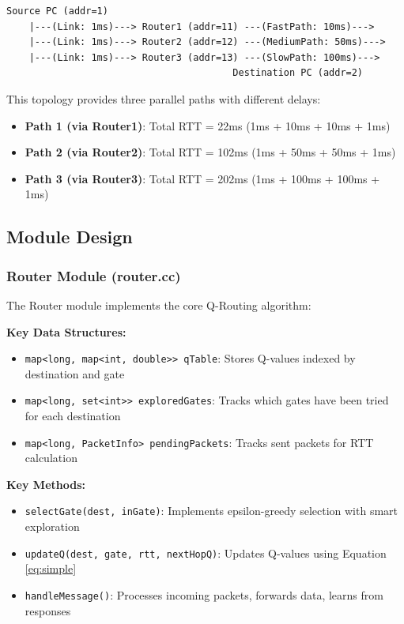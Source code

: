 \documentclass[12pt,a4paper]{article}
\begin{document}
\begin{verbatim}
Source PC (addr=1)
    |---(Link: 1ms)---> Router1 (addr=11) ---(FastPath: 10ms)---> 
    |---(Link: 1ms)---> Router2 (addr=12) ---(MediumPath: 50ms)--->
    |---(Link: 1ms)---> Router3 (addr=13) ---(SlowPath: 100ms)---> 
                                        Destination PC (addr=2)
\end{verbatim}

This topology provides three parallel paths with different delays:
\begin{itemize}
    \item \textbf{Path 1 (via Router1)}: Total RTT = 22ms (1ms + 10ms + 10ms + 1ms)
    \item \textbf{Path 2 (via Router2)}: Total RTT = 102ms (1ms + 50ms + 50ms + 1ms)
    \item \textbf{Path 3 (via Router3)}: Total RTT = 202ms (1ms + 100ms + 100ms + 1ms)
\end{itemize}

\subsection{Module Design}

\subsubsection{Router Module (router.cc)}

The Router module implements the core Q-Routing algorithm:

\textbf{Key Data Structures:}
\begin{itemize}
    \item \texttt{map<long, map<int, double>> qTable}: Stores Q-values indexed by destination and gate
    \item \texttt{map<long, set<int>> exploredGates}: Tracks which gates have been tried for each destination
    \item \texttt{map<long, PacketInfo> pendingPackets}: Tracks sent packets for RTT calculation
\end{itemize}

\textbf{Key Methods:}
\begin{itemize}
    \item \texttt{selectGate(dest, inGate)}: Implements epsilon-greedy selection with smart exploration
    \item \texttt{updateQ(dest, gate, rtt, nextHopQ)}: Updates Q-values using Equation \ref{eq:simple}
    \item \texttt{handleMessage()}: Processes incoming packets, forwards data, learns from responses
\end{itemize}
\end{document}
